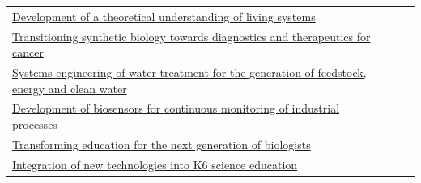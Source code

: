 \textcolor{blue}{\begin{tabular}{lll}  
\href{http://qbio.ucsd.edu}{Development of a theoretical understanding of living systems}\\
\href{http://gencirq.com}{Transitioning synthetic biology towards diagnostics and therapeutics for cancer}\\
\href{https://www.qbisci.com/fiscalini-dairy}{Systems engineering of water treatment for the generation of feedstock, energy and clean water}\\
\href{https://www.qbisci.com/sensors/}{Development of biosensors for continuous monitoring of industrial processes}\\
\href{https://qbio.ucsd.edu}{Transforming education for the next generation of biologists}\\
\href{http://biocircuits.sdsc.edu/outreach/}{Integration of new technologies into K6 science education}\\
\end{tabular}\\}
